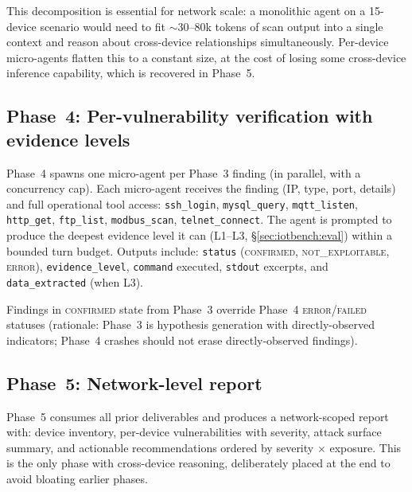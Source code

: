 This decomposition is essential for network scale: a monolithic agent on a
15-device scenario would need to fit $\sim$30--80k tokens of scan output into
a single context and reason about cross-device relationships
simultaneously. Per-device micro-agents flatten this to a constant size, at
the cost of losing some cross-device inference capability, which is recovered
in Phase~5.

\subsection{Phase~4: Per-vulnerability verification with evidence levels}
\label{sec:harness:phase4}

Phase~4 spawns one micro-agent per Phase~3 finding (in parallel, with a
concurrency cap). Each micro-agent receives the finding (IP, type, port,
details) and full operational tool access: \texttt{ssh\_login},
\texttt{mysql\_query}, \texttt{mqtt\_listen}, \texttt{http\_get},
\texttt{ftp\_list}, \texttt{modbus\_scan}, \texttt{telnet\_connect}. The agent
is prompted to produce the deepest evidence level it can (L1--L3,
\S\ref{sec:iotbench:eval}) within a bounded turn budget.
Outputs include: \texttt{status} (\textsc{confirmed}, \textsc{not\_exploitable},
\textsc{error}), \texttt{evidence\_level}, \texttt{command} executed,
\texttt{stdout} excerpts, and \texttt{data\_extracted} (when L3).

Findings in \textsc{confirmed} state from Phase~3 override Phase~4
\textsc{error}/\textsc{failed} statuses (rationale:
Phase~3 is hypothesis generation with directly-observed indicators; Phase~4
crashes should not erase directly-observed findings).

\subsection{Phase~5: Network-level report}
\label{sec:harness:report}

Phase~5 consumes all prior deliverables and produces a network-scoped report
with: device inventory, per-device vulnerabilities with severity, attack
surface summary, and actionable recommendations ordered by severity $\times$
exposure. This is the only phase with cross-device reasoning, deliberately
placed at the end to avoid bloating earlier phases.

